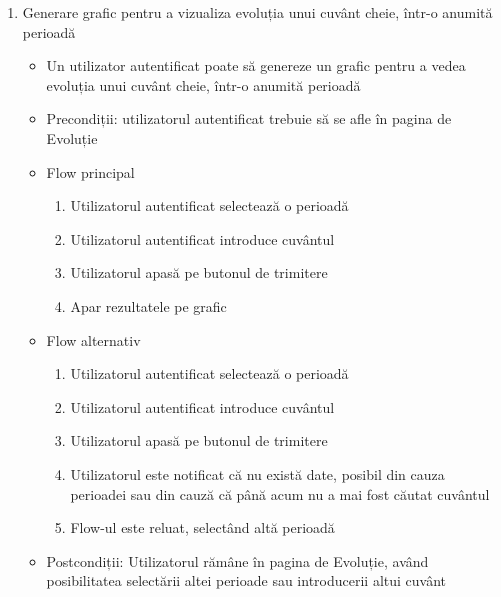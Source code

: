\begin{enumerate}
    \item Generare grafic pentru a vizualiza evoluția unui cuvânt cheie, într-o anumită perioadă
    \begin{itemize}
        \setlength\itemsep{0.5em}
        \item Un utilizator autentificat poate să genereze un grafic pentru a vedea evoluția unui cuvânt cheie, într-o anumită perioadă
        \item Precondiții: utilizatorul autentificat trebuie să se afle în pagina de Evoluție
        \item Flow principal
        \begin{enumerate}
            \setlength\itemsep{0.5em}
            \item Utilizatorul autentificat selectează o perioadă
            \item Utilizatorul autentificat introduce cuvântul
            \item Utilizatorul apasă pe butonul de trimitere
            \item Apar rezultatele pe grafic
        \end{enumerate}
        \item Flow alternativ
        \begin{enumerate}
            \setlength\itemsep{0.5em}
            \item Utilizatorul autentificat selectează o perioadă
            \item Utilizatorul autentificat introduce cuvântul
            \item Utilizatorul apasă pe butonul de trimitere
            \item Utilizatorul este notificat că nu există date, posibil din cauza perioadei sau din cauză că până acum nu a mai fost căutat cuvântul
            \item Flow-ul este reluat, selectând altă perioadă
        \end{enumerate}
        \item Postcondiții: Utilizatorul rămâne în pagina de Evoluție, având posibilitatea selectării altei perioade sau introducerii altui cuvânt
    \end{itemize}


\end{enumerate}
